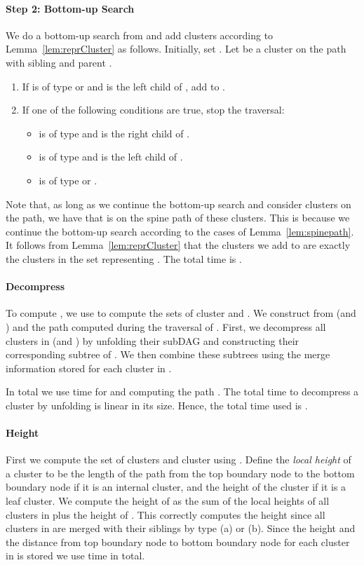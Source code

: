 \documentclass [11pt]{article}
\begin{document}
\paragraph{Step 2: Bottom-up Search} We do a bottom-up search from  and add clusters according to Lemma~\ref{lem:reprCluster} as follows. Initially, set . Let  be a cluster on the path with sibling  and parent .
\begin{enumerate}
\item If  is of type  or  and  is the left child of , add  to .
\item  If one of the following conditions are true, stop  the traversal:
\begin{itemize}
\item  is of type  and  is the right child of .
\item  is of type  and  is the left child of .
\item  is of type  or .
\end{itemize}
\end{enumerate}
Note that, as long as we continue the bottom-up search and consider clusters on the path, we have that  is on the spine path of these clusters. This is because we continue the bottom-up search  according to the cases of Lemma~\ref{lem:spinepath}. It follows from  Lemma~\ref{lem:reprCluster} that the clusters we add to  are exactly the clusters in the set representing . The total time is .


\paragraph{Decompress} 
To compute , we use  to compute the sets of cluster  and . We construct  from  (and ) and the path  computed during the traversal of . First, we decompress all clusters in  (and ) by unfolding their subDAG and constructing their corresponding subtree of . We then combine these subtrees using the merge information stored for each cluster in .   

In total we use  time for  and computing the path . The total time to decompress a cluster  by unfolding is linear in its size. Hence, the total time used is .  

\paragraph{Height} First we compute the set of clusters  and cluster  using . Define the \emph{local height} of a cluster to be the length of the path from the top boundary node to the bottom boundary node if it is an internal cluster, and the height of the cluster if it is a leaf cluster.  We compute the height of  as the sum of the local heights of all clusters in  plus the height of . This correctly computes the height since all clusters in  are merged with their siblings by type (a) or (b). Since the  height and the distance from top boundary node to bottom boundary node for each cluster in  is stored we use  time in total. 
\end{document}
